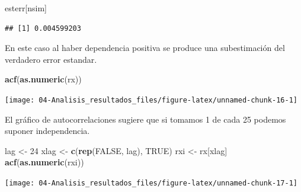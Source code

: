 \documentclass[]{book}
\newenvironment{Shaded}{\begin{snugshade}}{\end{snugshade}}
\newcommand{\KeywordTok}[1]{\textcolor[rgb]{0.13,0.29,0.53}{\textbf{#1}}}
\newcommand{\DecValTok}[1]{\textcolor[rgb]{0.00,0.00,0.81}{#1}}
\newcommand{\StringTok}[1]{\textcolor[rgb]{0.31,0.60,0.02}{#1}}
\newcommand{\OtherTok}[1]{\textcolor[rgb]{0.56,0.35,0.01}{#1}}
\newcommand{\NormalTok}[1]{#1}
\theoremstyle{definition}
\theoremstyle{definition}
\theoremstyle{definition}
\theoremstyle{remark}
\begin{document}
\begin{Shaded}
\begin{Highlighting}[]
\NormalTok{esterr[nsim]}
\end{Highlighting}
\end{Shaded}

\begin{verbatim}
## [1] 0.004599203
\end{verbatim}

En este caso al haber dependencia positiva se produce una subestimación
del verdadero error estandar.

\begin{Shaded}
\begin{Highlighting}[]
\KeywordTok{acf}\NormalTok{(}\KeywordTok{as.numeric}\NormalTok{(rx))}
\end{Highlighting}
\end{Shaded}

\begin{center}\texttt{[image: 04-Analisis\_resultados\_files/figure-latex/unnamed-chunk-16-1]} \end{center}

El gráfico de autocorrelaciones sugiere que si tomamos 1 de cada 25
podemos suponer independencia.

\begin{Shaded}
\begin{Highlighting}[]
\NormalTok{lag <-}\StringTok{ }\DecValTok{24}
\NormalTok{xlag <-}\StringTok{ }\KeywordTok{c}\NormalTok{(}\KeywordTok{rep}\NormalTok{(}\OtherTok{FALSE}\NormalTok{, lag), }\OtherTok{TRUE}\NormalTok{)}
\NormalTok{rxi <-}\StringTok{ }\NormalTok{rx[xlag]}
\KeywordTok{acf}\NormalTok{(}\KeywordTok{as.numeric}\NormalTok{(rxi))}
\end{Highlighting}
\end{Shaded}

\begin{center}\texttt{[image: 04-Analisis\_resultados\_files/figure-latex/unnamed-chunk-17-1]} \end{center}
\end{document}
